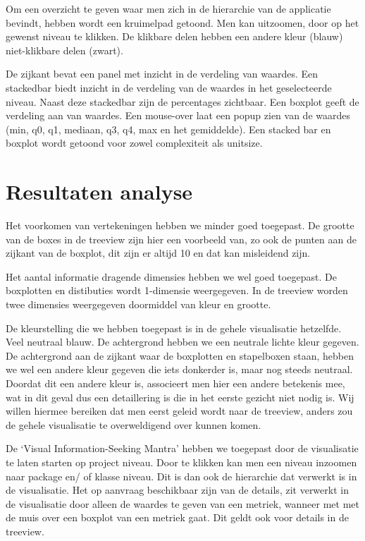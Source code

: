 \documentclass[a4paper]{article}
\begin{document}
Om een overzicht te geven waar men zich in de hierarchie van de applicatie bevindt, hebben wordt een kruimelpad getoond. Men kan uitzoomen, door op het gewenst niveau te klikken. De klikbare delen hebben een andere kleur (blauw) niet-klikbare delen (zwart).

De zijkant bevat een panel met inzicht in de verdeling van waardes. Een stackedbar biedt inzicht in de verdeling van de waardes in het geselecteerde niveau. Naast deze stackedbar zijn de percentages zichtbaar. Een boxplot geeft de verdeling aan van waardes. Een mouse-over laat een popup zien van de waardes (min, q0, q1, mediaan, q3, q4, max en het gemiddelde).
Een stacked bar en boxplot wordt getoond voor zowel complexiteit als unitsize.


\section{Resultaten analyse}
Het voorkomen van vertekeningen hebben we minder goed toegepast. De grootte van de boxes in de treeview zijn hier een voorbeeld van, zo ook de punten aan de zijkant van de boxplot, dit zijn er altijd 10 en dat kan misleidend zijn.

Het aantal informatie dragende dimensies hebben we wel goed toegepast. De boxplotten en distibuties wordt 1-dimensie weergegeven. In de treeview worden twee dimensies weergegeven doormiddel van kleur en grootte. 

De kleurstelling die we hebben toegepast is in de gehele visualisatie hetzelfde. Veel neutraal blauw. De achtergrond hebben we een neutrale lichte kleur gegeven. De achtergrond aan de zijkant waar de boxplotten en stapelboxen staan, hebben we wel een andere kleur gegeven die iets donkerder is, maar nog steeds neutraal. Doordat dit een andere kleur is, associeert men hier een andere betekenis mee, wat in dit geval dus een detaillering is die in het eerste gezicht niet nodig is. Wij willen hiermee bereiken dat men eerst geleid wordt naar de treeview, anders zou de gehele visualisatie te overweldigend over kunnen komen.

De `Visual Information-Seeking Mantra' hebben we toegepast door de visualisatie te laten starten op project niveau. Door te klikken kan men een niveau inzoomen naar package en/ of klasse niveau. Dit is dan ook de hierarchie dat verwerkt is in de visualisatie. Het op aanvraag beschikbaar zijn van de details, zit verwerkt in de visualisatie door alleen de waardes te geven van een metriek, wanneer met met de muis over een boxplot van een metriek gaat. Dit geldt ook voor details in de treeview.



\end{document}
